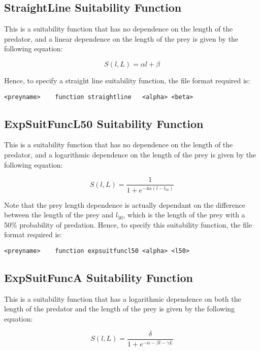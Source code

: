 \documentclass [a4paper, 10pt]{book}
\begin{document}
\subsection{StraightLine Suitability Function}
This is a suitability function that has no dependence on the length of the predator, and a linear dependence on the length of the prey is given by the following equation:

\begin{equation}\label{eq:straightsuit}
S(l, L) = \alpha l + \beta
\end{equation}

\bigskip
Hence, to specify a straight line suitability function, the file format required is:

{\small\begin{verbatim}
<preyname>    function straightline   <alpha> <beta>
\end{verbatim}}

\subsection{ExpSuitFuncL50 Suitability Function}
This is a suitability function that has no dependence on the length of the predator, and a logarithmic dependence on the length of the prey is given by the following equation:

\begin{equation}\label{eq:l50suit}
S(l, L) = { \frac{1}{1 + e^{ -4 \alpha (l - l_{50})}}}
\end{equation}

\bigskip
Note that the prey length dependence is actually dependant on the difference between the length of the prey and $l_{50}$, which is the length of the prey with a 50\% probability of predation.  Hence, to specify this suitability function, the file format required is:

{\small\begin{verbatim}
<preyname>    function expsuitfuncl50 <alpha> <l50>
\end{verbatim}}

\subsection{ExpSuitFuncA Suitability Function}
This is a suitability function that has a logarithmic dependence on both the length of the predator and the length of the prey is given by the following equation:

\begin{equation}\label{eq:expsuit}
S(l, L) = { \frac{\delta}{1 + e^{- \alpha - \beta l - \gamma  L}}}
\end{equation}
\end{document}
